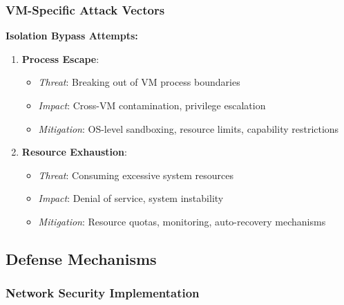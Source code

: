 \documentclass[11pt,a4paper]{article}
\begin{document}
\subsubsection{VM-Specific Attack Vectors}

\textbf{Isolation Bypass Attempts:}
\begin{enumerate}
    \item \textbf{Process Escape}:
    \begin{itemize}
        \item \textit{Threat}: Breaking out of VM process boundaries
        \item \textit{Impact}: Cross-VM contamination, privilege escalation
        \item \textit{Mitigation}: OS-level sandboxing, resource limits, capability restrictions
    \end{itemize}
    
    \item \textbf{Resource Exhaustion}:
    \begin{itemize}
        \item \textit{Threat}: Consuming excessive system resources
        \item \textit{Impact}: Denial of service, system instability
        \item \textit{Mitigation}: Resource quotas, monitoring, auto-recovery mechanisms
    \end{itemize}
\end{enumerate}

\subsection{Defense Mechanisms}

\subsubsection{Network Security Implementation}
\end{document}
